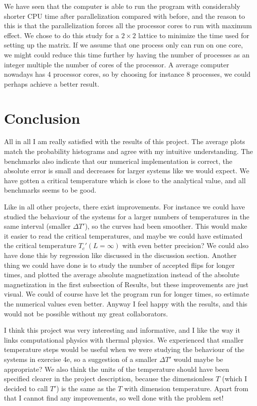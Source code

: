 \documentclass[norsk,a4paper,12pt]{article}
\begin{document}
We have seen that the computer is able to run the program with considerably shorter CPU time after parallelization compared with before, and the reason to this is that the parallelization forces all the processor cores to run with maximum effect. We chose to do this study for a $2\times2$ lattice to minimize the time used for setting up the matrix. If we assume that one process only can run on one core, we might could reduce this time further by having the number of processes as an integer multiple the number of cores of the processor. A average computer nowadays has 4 processor cores, so by choosing for instance 8 processes, we could perhaps achieve a better result.

\section{Conclusion}
All in all I am really satisfied with the results of this project. The average plots match the probability histograms and agree with my intuitive understanding. The benchmarks also indicate that our numerical implementation is correct, the absolute error is small and decreases for larger systems like we would expect. We have gotten a critical temperature which is close to the analytical value, and all benchmarks seems to be good. \par\vspace{5mm}

Like in all other projects, there exist improvements. For instance we could have studied the behaviour of the systems for a larger numbers of temperatures in the same interval (smaller $\Delta T'$), so the curves had been smoother. This would make it easier to read the critical temperatures, and maybe we could have estimated the critical temperature $T_c'(L=\infty)$ with even better precision? We could also have done this by regression like discussed in the discussion section. Another thing we could have done is to study the number of accepted flips for longer times, and plotted the average absolute magnetization instead of the absolute magnetization in the first subsection of Results, but these improvements are just visual. We could of course have let the program run for longer times, so estimate the numerical values even better. Anyway I feel happy with the results, and this would not be possible without my great collaborators.\par\vspace{5mm}

I think this project was very interesting and informative, and I like the way it links computational physics with thermal physics. We experienced that smaller temperature steps would be useful when we were studying the behaviour of the systems in exercise 4e, so a suggestion of a smaller $\Delta T'$ would maybe be appropriate? We also think the units of the temperature should have been specified clearer in the project description, because the dimensionless $T$ (which I decided to call $T'$) is the same as the $T$ with dimension temperature. Apart from that I cannot find any improvements, so well done with the problem set!
\end{document}
